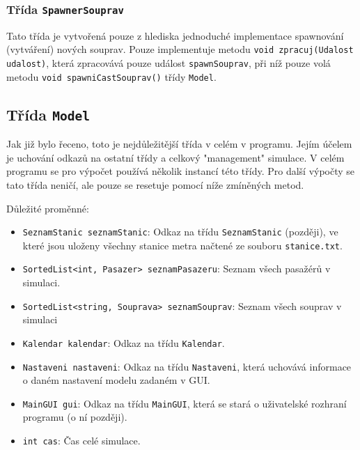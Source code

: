 \documentclass[12pt, a4paper]{article}
\begin{document}
\subsubsection{Třída \texttt{SpawnerSouprav}}
Tato třída je vytvořená pouze z hlediska jednoduché implementace spawnování (vytváření) nových souprav. Pouze implementuje metodu \texttt{void zpracuj(Udalost udalost)}, která zpracovává pouze událost \texttt{spawnSouprav}, při níž pouze volá metodu \texttt{void spawniCastSouprav()} třídy \texttt{Model}.

\subsection{Třída \texttt{Model}}
Jak již bylo řeceno, toto je nejdůležitější třída v celém v programu. Jejím účelem je uchování odkazů na ostatní třídy a celkový "management" simulace. V celém programu se pro výpočet používá několik instancí této třídy. Pro další výpočty se tato třída neničí, ale pouze se resetuje pomocí níže zmíněných metod.

Důležité proměnné:
\begin{itemize}
    \item \texttt{SeznamStanic seznamStanic}: Odkaz na třídu \texttt{SeznamStanic} (později), ve které jsou uloženy všechny stanice metra načtené ze souboru \texttt{stanice.txt}.
    \item \texttt{SortedList<int, Pasazer> seznamPasazeru}: Seznam všech pasažérů v simulaci.
    \item \texttt{SortedList<string, Souprava> seznamSouprav}: Seznam všech souprav v simulaci
    \item \texttt{Kalendar kalendar}: Odkaz na třídu \texttt{Kalendar}.
    \item \texttt{Nastaveni nastaveni}: Odkaz na třídu \texttt{Nastaveni}, která uchovává informace o daném nastavení modelu zadaném v GUI.
    \item \texttt{MainGUI gui}: Odkaz na třídu \texttt{MainGUI}, která se stará o uživatelské rozhraní programu (o ní později).
    \item \texttt{int cas}: Čas celé simulace.
\end{itemize}
\end{document}
